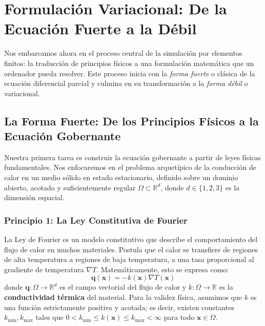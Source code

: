 \section{Formulación Variacional: De la Ecuación Fuerte a la Débil}
\label{sec:poisson-derivation}

Nos embarcamos ahora en el proceso central de la simulación por elementos finitos: la traducción de principios físicos a una formulación matemática que un ordenador pueda resolver. Este proceso inicia con la \textit{forma fuerte} o clásica de la ecuación diferencial parcial y culmina en su transformación a la \textit{forma débil} o variacional.

\subsection{La Forma Fuerte: De los Principios Físicos a la Ecuación Gobernante}
Nuestra primera tarea es construir la ecuación gobernante a partir de leyes físicas fundamentales. Nos enfocaremos en el problema arquetípico de la conducción de calor en un medio sólido en estado estacionario, definido sobre un dominio abierto, acotado y suficientemente regular \(\Omega \subset \mathbb{R}^d\), donde \(d \in \{1, 2, 3\}\) es la dimensión espacial.

\subsubsection{Principio 1: La Ley Constitutiva de Fourier}
La Ley de Fourier es un modelo constitutivo que describe el comportamiento del flujo de calor en muchos materiales. Postula que el calor se transfiere de regiones de alta temperatura a regiones de baja temperatura, a una tasa proporcional al gradiente de temperatura \(\nabla T\). Matemáticamente, esto se expresa como:
\begin{equation}
    \bm{q}(\bm{x}) = -k(\bm{x}) \nabla T(\bm{x})
    \label{eq:fourier-law}
\end{equation}
donde \(\bm{q}: \Omega \to \mathbb{R}^d\) es el campo vectorial del flujo de calor y \(k: \Omega \to \mathbb{R}\) es la \textbf{conductividad térmica} del material. Para la validez física, asumimos que \(k\) es una función estrictamente positiva y acotada; es decir, existen constantes \(k_{\min}, k_{\max}\) tales que \(0 < k_{\min} \leq k(\bm{x}) \leq k_{\max} < \infty\) para todo \(\bm{x} \in \Omega\).

